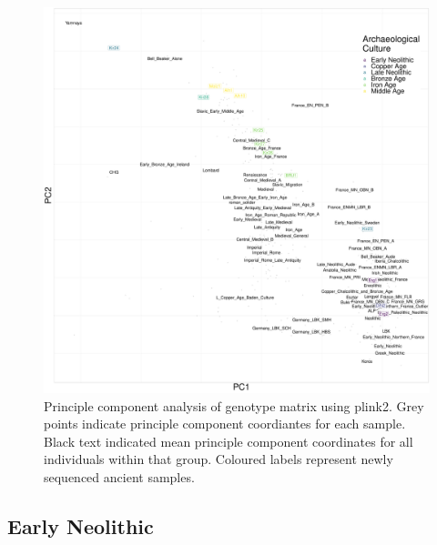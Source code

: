 \begin{figure}[htp]
    \centering
    \includegraphics[width=1.0\textwidth]{../images/chapter4/plink_PCA.pdf}
    \caption{Principle component analysis of genotype matrix using plink2. Grey points indicate principle component coordiantes for each sample. Black text indicated mean principle component coordinates for all individuals within that group. Coloured labels represent newly sequenced ancient samples.}
    \label{fig:plink_PCA}
\end{figure}

\subsection{Early Neolithic}

